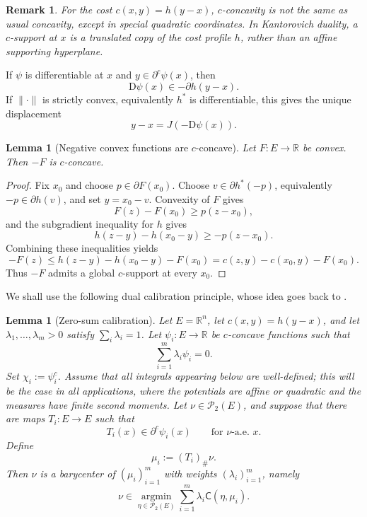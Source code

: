 \documentclass[a4paper,11pt]{article}
\numberwithin{equation}{section}
\newtheorem{lemma}[theorem]{Lemma}
\newtheorem{remark}[theorem]{Remark}
\newcommand{\R}{\mathbb{R}}
\newcommand{\D}{\mathrm D}
\begin{document}
	\begin{remark}
		For the cost $c(x,y)=h(y-x)$, $c$-concavity is not the same as usual concavity, except in special quadratic coordinates. In Kantorovich duality, a $c$-support at $x$ is a translated copy of the cost profile $h$, rather than an affine supporting hyperplane.
	\end{remark}
	
	If $\psi$ is differentiable at $x$ and $y\in\partial^c\psi(x)$, then
	\[
	\D\psi(x)\in -\partial h(y-x).
	\]
	If $\|\cdot\|$ is strictly convex, equivalently $h^*$ is differentiable, this gives the unique displacement
	\[
	y-x=J(-\D\psi(x)).
	\]
	
	\begin{lemma}[Negative convex functions are $c$-concave]
		\label{lem:negative-convex}
		Let $F:E\to\R$ be convex. Then $-F$ is $c$-concave.
	\end{lemma}
	
	\begin{proof}
		Fix $x_0$ and choose $p\in\partial F(x_0)$. Choose $v\in\partial h^*(-p)$, equivalently $-p\in\partial h(v)$, and set $y=x_0-v$. Convexity of $F$ gives
		\[
		F(z)-F(x_0)\ge p(z-x_0),
		\]
		and the subgradient inequality for $h$ gives
		\[
		h(z-y)-h(x_0-y)\ge -p(z-x_0).
		\]
		Combining these inequalities yields
		\[
		-F(z)\le h(z-y)-h(x_0-y)-F(x_0)
		=c(z,y)-c(x_0,y)-F(x_0).
		\]
		Thus $-F$ admits a global $c$-support at every $x_0$.
	\end{proof}
	
	
	
	
	
	
	
	
	
	
	
	We shall use the following dual calibration principle, whose idea goes back to \cite{CarlierEkeland2010}.
	
	\begin{lemma}[Zero-sum calibration]
		\label{lem:dual-calibration}
		Let \(E=\mathbb R^n\), let \(c(x,y)=h(y-x)\), and let
		\(\lambda_1,\ldots,\lambda_m>0\) satisfy \(\sum_i\lambda_i=1\).
		Let \(\psi_i:E\to\mathbb R\) be \(c\)-concave functions such that
		\[
		\sum_{i=1}^m \lambda_i\psi_i=0.
		\]
		Set \(\chi_i:=\psi_i^c\). Assume that all integrals appearing below are well-defined; this will be the
		case in all applications, where the potentials are affine or quadratic and the
		measures have finite second moments. Let \(\nu\in\mathcal P_2(E)\), and suppose that
		there are maps \(T_i:E\to E\) such that
		\[
		T_i(x)\in\partial^c\psi_i(x)
		\qquad\text{for \(\nu\)-a.e. }x.
		\]
		Define
		\[
		\mu_i:=(T_i)_\#\nu.
		\]
		Then \(\nu\) is a barycenter of \((\mu_i)_{i=1}^m\) with weights
		\((\lambda_i)_{i=1}^m\), namely
		\[
		\nu\in\operatorname*{argmin}_{\eta\in\mathcal P_2(E)}
		\sum_{i=1}^m\lambda_i \mathsf C(\eta,\mu_i).
		\]
		
	\end{lemma}
	
\end{document}
